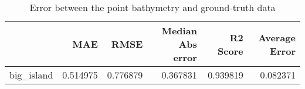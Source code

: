 \begin{table}[h!]
\centering
\caption{Error between the point bathymetry and ground-truth data}
\label{tab:big_island_lidar_error}
\begin{tabular}{lrrrrr}
\toprule
 & MAE & RMSE & Median Abs error & R2 Score & Average Error \\
\midrule
big_island & 0.514975 & 0.776879 & 0.367831 & 0.939819 & 0.082371 \\
\bottomrule
\end{tabular}
\end{table}
